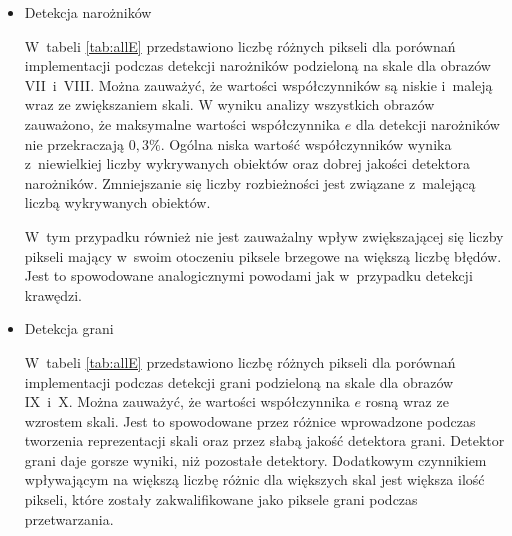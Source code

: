 \begin{itemize}
\item{Detekcja narożników}
\label{subsubsec:naroznikiTabele}

\nopagebreak
W~tabeli \ref{tab:allE} przedstawiono liczbę różnych pikseli dla porównań implementacji podczas detekcji narożników podzieloną na skale dla obrazów VII~i~VIII. Można zauważyć, że wartości współczynników są niskie i~maleją wraz ze zwiększaniem skali. W wyniku analizy wszystkich obrazów zauważono, że maksymalne wartości współczynnika $ e $ dla detekcji narożników nie przekraczają $ 0,3 \% $. Ogólna niska wartość współczynników wynika z~niewielkiej liczby wykrywanych obiektów oraz dobrej jakości detektora narożników. Zmniejszanie się liczby rozbieżności jest związane z~malejącą liczbą wykrywanych obiektów.

W~tym przypadku również nie jest zauważalny wpływ zwiększającej się liczby pikseli mający w~swoim otoczeniu piksele brzegowe na większą liczbę błędów. Jest to spowodowane analogicznymi powodami jak w~przypadku detekcji krawędzi.

\item{Detekcja grani}
\label{subsubsec:granieTabele}

\nopagebreak
W~tabeli \ref{tab:allE} przedstawiono liczbę różnych pikseli dla porównań implementacji podczas detekcji grani podzieloną na skale dla obrazów IX~i~X. Można zauważyć, że wartości współczynnika $ e $ rosną wraz ze wzrostem skali. Jest to spowodowane przez różnice wprowadzone podczas tworzenia reprezentacji skali oraz przez słabą jakość detektora grani. Detektor grani daje gorsze wyniki, niż pozostałe detektory. Dodatkowym czynnikiem wpływającym na większą liczbę różnic dla większych skal jest większa ilość pikseli, które zostały zakwalifikowane jako piksele grani podczas przetwarzania.
\end{itemize}